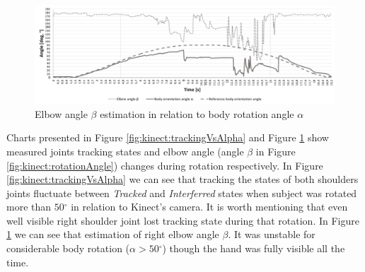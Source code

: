 \documentclass[sensors,article,submit,moreauthors,pdftex,10pt,a4paper]{mdpi}
\newcommand{\degree}{\ensuremath{{}^{\circ}}\xspace}
\begin{document}
\begin{figure}[H]
	\centering
	\includegraphics[width=12cm]{Figure5.png}
	\caption{Elbow angle $\beta$ estimation in relation to body rotation angle $\alpha$}
	\label{fig:kinect:betaVsAlpha}
\end{figure}

Charts presented in Figure \ref{fig:kinect:trackingVsAlpha} and Figure \ref{fig:kinect:betaVsAlpha} show measured joints tracking states and elbow angle (angle $\beta$ in Figure \ref{fig:kinect:rotationAngle}) changes during rotation respectively. In Figure \ref{fig:kinect:trackingVsAlpha}  we can see that tracking the states of both shoulders joints fluctuate between \emph{Tracked} and \emph{Interferred} states when subject was rotated more than $50\degree$ in relation to Kinect’s camera. It is worth mentioning that even well visible right shoulder joint lost tracking state during that rotation. In Figure \ref{fig:kinect:betaVsAlpha} we can see that estimation of right elbow angle $\beta$. It was unstable for considerable body rotation ($\alpha > 50\degree$) though the hand was fully visible all the time.
\end{document}

